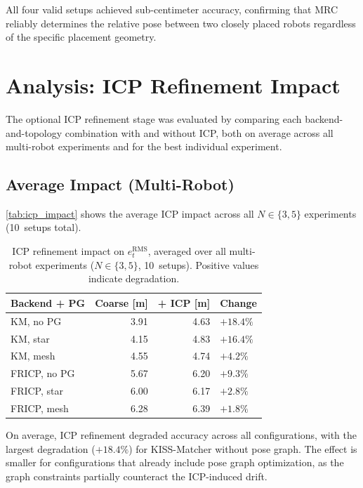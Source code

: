 All four valid setups achieved sub-centimeter accuracy, confirming
that MRC reliably determines the relative pose between two closely
placed robots regardless of the specific placement geometry.

\section{Analysis: ICP Refinement Impact}
\label{sec:icp_impact}

The optional ICP refinement stage was evaluated by comparing each
backend-and-topology combination with and without ICP, both on
average across all multi-robot experiments and for the best
individual experiment.

\subsection{Average Impact (Multi-Robot)}

\autoref{tab:icp_impact} shows the average ICP impact across all
$N \in \{3, 5\}$ experiments (10~setups total).

\begin{table}[htbp]
    \centering
    \caption{ICP refinement impact on $e_t^\mathrm{RMS}$,
             averaged over all multi-robot experiments
             ($N \in \{3, 5\}$, 10~setups).
             Positive values indicate degradation.}
    \label{tab:icp_impact}
    \begin{tabular}{l r r l}
        \toprule
        \textbf{Backend + PG}
            & \textbf{Coarse} [m]
            & \textbf{+ ICP} [m]
            & \textbf{Change} \\
        \midrule
        KM, no PG    & 3.91  & 4.63  & $+18.4\%$ \\
        KM, star     & 4.15  & 4.83  & $+16.4\%$ \\
        KM, mesh     & 4.55  & 4.74  & $+4.2\%$  \\
        FRICP, no PG & 5.67  & 6.20  & $+9.3\%$  \\
        FRICP, star  & 6.00  & 6.17  & $+2.8\%$  \\
        FRICP, mesh  & 6.28  & 6.39  & $+1.8\%$  \\
        \bottomrule
    \end{tabular}
\end{table}

On average, ICP refinement degraded accuracy across all
configurations, with the largest degradation ($+18.4\%$) for
KISS-Matcher without pose graph.
The effect is smaller for configurations that already include
pose graph optimization, as the graph constraints partially
counteract the ICP-induced drift.

